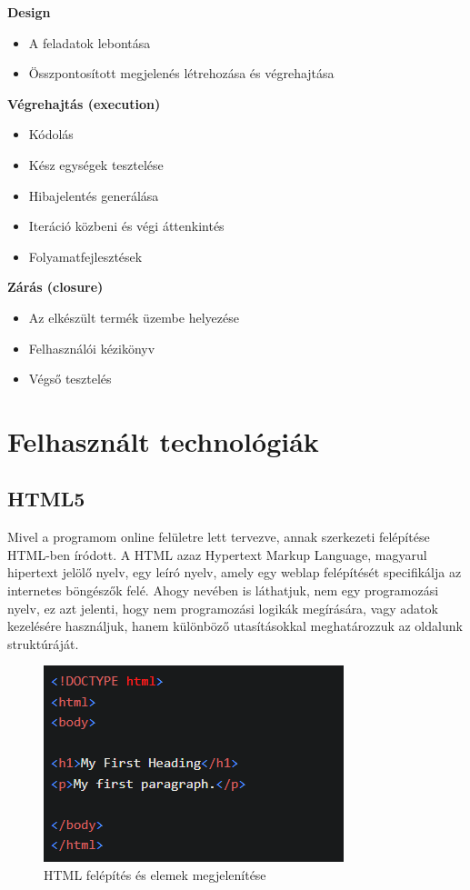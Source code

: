 \textbf{Design}
\begin{itemize}
\item A feladatok lebontása
\item Összpontosított megjelenés létrehozása és végrehajtása
\end{itemize}

\textbf{Végrehajtás (execution)}
\begin{itemize}
\item Kódolás
\item Kész egységek tesztelése
\item Hibajelentés generálása
\item Iteráció közbeni és végi áttenkintés
\item Folyamatfejlesztések
\end{itemize}

\textbf{Zárás (closure)}
\begin{itemize}
\item Az elkészült termék üzembe helyezése
\item Felhasználói kézikönyv
\item Végső tesztelés
\end{itemize}

\section{Felhasznált technológiák}

\subsection{HTML5}
Mivel a programom online felületre lett tervezve, annak szerkezeti felépítése HTML-ben íródott. A HTML azaz Hypertext Markup Language, magyarul hipertext jelölő nyelv, egy leíró nyelv, amely egy weblap felépítését specifikálja az internetes böngészők felé. Ahogy nevében is láthatjuk, nem egy programozási nyelv, ez azt jelenti, hogy nem programozási logikák megírására, vagy adatok kezelésére használjuk, hanem különböző utasításokkal meghatározzuk az oldalunk struktúráját. \\

\begin{figure}[h]
\centering
\includegraphics[scale=0.8]{images/htmlExample.png}
\caption{HTML felépítés és elemek megjelenítése}
\end{figure}

